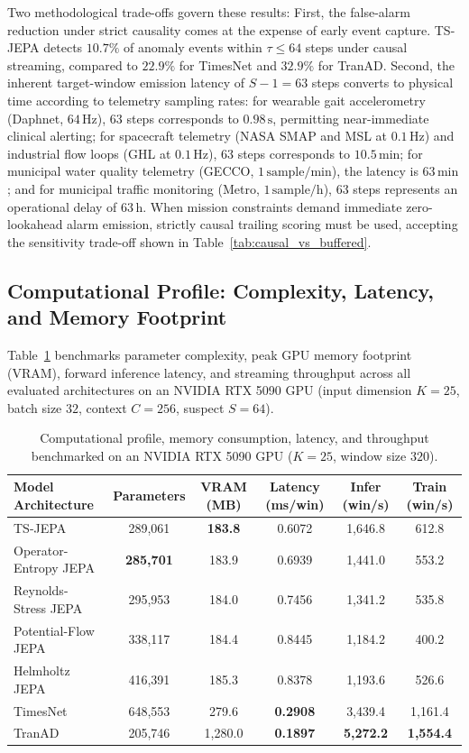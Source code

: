 Two methodological trade-offs govern these results:
First, the false-alarm reduction under strict causality comes at the expense of early event capture. TS-JEPA detects $10.7\%$ of anomaly events within $\tau \le 64$ steps under causal streaming, compared to $22.9\%$ for TimesNet and $32.9\%$ for TranAD.
Second, the inherent target-window emission latency of $S - 1 = 63$ steps converts to physical time according to telemetry sampling rates: for wearable gait accelerometry (Daphnet, $64\,\text{Hz}$), 63 steps corresponds to $0.98\,\text{s}$, permitting near-immediate clinical alerting; for spacecraft telemetry (NASA SMAP and MSL at $0.1\,\text{Hz}$) and industrial flow loops (GHL at $0.1\,\text{Hz}$), 63 steps corresponds to $10.5\,\text{min}$; for municipal water quality telemetry (GECCO, $1\,\text{sample/min}$), the latency is $63\,\text{min}$; and for municipal traffic monitoring (Metro, $1\,\text{sample/h}$), 63 steps represents an operational delay of $63\,\text{h}$. When mission constraints demand immediate zero-lookahead alarm emission, strictly causal trailing scoring must be used, accepting the sensitivity trade-off shown in Table~\ref{tab:causal_vs_buffered}.

\subsection{Computational Profile: Complexity, Latency, and Memory Footprint}
\label{subsec:computational_profile}

Table~\ref{tab:computational_profile} benchmarks parameter complexity, peak GPU memory footprint (VRAM), forward inference latency, and streaming throughput across all evaluated architectures on an NVIDIA RTX 5090 GPU (input dimension $K=25$, batch size $32$, context $C=256$, suspect $S=64$).

\begin{table}[t]
\centering
\small
\caption{Computational profile, memory consumption, latency, and throughput benchmarked on an NVIDIA RTX 5090 GPU ($K=25$, window size $320$).}
\label{tab:computational_profile}
\scriptsize
\setlength{\tabcolsep}{2.5pt}
\begin{tabular}{@{}lccccc@{}}
\toprule
\textbf{Model Architecture} & \textbf{Parameters} & \textbf{VRAM (MB)} & \textbf{Latency (ms/win)} & \textbf{Infer (win/s)} & \textbf{Train (win/s)} \\
\midrule
TS-JEPA & 289,061 & \textbf{183.8} & 0.6072 & 1,646.8 & 612.8 \\
Operator-Entropy JEPA & \textbf{285,701} & 183.9 & 0.6939 & 1,441.0 & 553.2 \\
Reynolds-Stress JEPA & 295,953 & 184.0 & 0.7456 & 1,341.2 & 535.8 \\
Potential-Flow JEPA & 338,117 & 184.4 & 0.8445 & 1,184.2 & 400.2 \\
Helmholtz JEPA & 416,391 & 185.3 & 0.8378 & 1,193.6 & 526.6 \\
TimesNet & 648,553 & 279.6 & \textbf{0.2908} & 3,439.4 & 1,161.4 \\
TranAD & 205,746 & 1,280.0 & \textbf{0.1897} & \textbf{5,272.2} & \textbf{1,554.4} \\
\bottomrule
\end{tabular}
\end{table}

